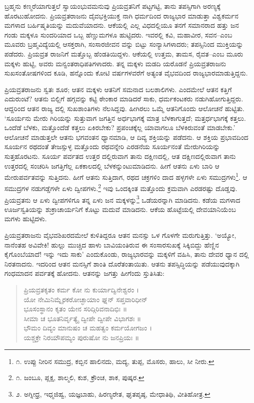 ಬ್ರಹ್ಮನು ಕಣ್ಮರೆಯಾಗುತ್ತಲೆ ಸ್ವಾಯಂಭುವಮನುವು ಪ್ರಿಯವ್ರತನಿಗೆ ಪಟ್ಟಗಟ್ಟಿ, ತಾನು ತಪಸ್ಸಿಗಾಗಿ ಅರಣ್ಯಕ್ಕೆ ಹೊರಟುಹೋದನು. ಪ್ರಿಯವ್ರತರಾಜನು ದೈವಭಕ್ತಿಯುಕ್ತ ನಾಗಿ ಧರ್ಮದಿಂದ ರಾಜ್ಯಭಾರ ಮಾಡುತ್ತಾ ವಿಶ್ವಕರ್ಮನ ಮಗಳಾದ ಬರ್ಹಿಷ್ಮತಿಯನ್ನು ಮದುವೆಯಾದನು. ಆಕೆಯಲ್ಲಿ ಎಲ್ಲ ವಿಧದಲ್ಲಿಯೂ ತನಗೆ ಸಮಾನರಾದ ಹತ್ತು ಜನ ಗಂಡು ಮಕ್ಕಳೂ ಸುಂದರಿಯಾದ ಒಬ್ಬ ಹೆಣ್ಣುಮಗಳೂ ಹುಟ್ಟಿದರು. ಇವರಲ್ಲಿ ಕವಿ, ಮಹಾವೀರ, ಸವನ–ಎಂಬ ಮೂವರು ಬ್ರಹ್ಮವಿದ್ಯೆಯಲ್ಲಿ ಆಸಕ್ತರಾಗಿ, ಸಂಸಾರಜೀವನ ವನ್ನು ಬಿಟ್ಟು ಸಂನ್ಯಾಸಿಗಳಾದರು; ತಪಸ್ಸಿನಿಂದ ಮುಕ್ತಿಯನ್ನು ಪಡೆದರು. ಪ್ರಿಯವ್ರತ ರಾಜನಿಗೆ ಮತ್ತೊಬ್ಬ ಹೆಂಡತಿಯಿದ್ದಳು. ಆಕೆಯಲ್ಲಿ ಉತ್ತಮ, ತಾಮಸ, ರೈವತ–ಎಂಬ ಮೂರು ಮಕ್ಕಳು ಹುಟ್ಟಿ, ಅವರು ಮನ್ವಂತರಾಧಿಪತಿಗಳಾದರು. ತನ್ನ ಮಕ್ಕಳು ಮಡದಿ ಯರೊಡನೆ ಪ್ರಿಯವ್ರತರಾಜನು ಸುಖಸಂತೋಷಗಳಿಂದ ಕೂಡಿ, ಹನ್ನೊಂದು ಕೋಟಿ ವರ್ಷಗಳವರೆಗೆ ಅತ್ಯಂತ ವೈಭವದಿಂದ ರಾಜ್ಯಭಾರಮಾಡುತ್ತಿದ್ದನು.

ಪ್ರಿಯವ್ರತರಾಜನು ಸ್ವತಃ ಶೂರ; ಆತನ ಮಕ್ಕಳು ಆತನಿಗೆ ಸಮನಾದ ಬಲಶಾಲಿಗಳು. ಎಂದಮೇಲೆ ಆತನ ಕತ್ತಿಗೆ ಎದುರುಂಟೆ? ಆತನು ಬಿಲ್ಲಿಗೆ ಹಗ್ಗವನ್ನು ಕಟ್ಟಿ ಠೇಂಕಾರ ಮಾಡಿದರೆ ಸಾಕು, ಧರ್ಮಕಂಟಕರು ನಡುಗಿಹೋಗುತ್ತಿದ್ದರು. ಆದ್ದರಿಂದ ಆತನ ರಾಜ್ಯ ದಲ್ಲಿ ಸುಖಶಾಂತಿಗಳು ನೆಲಸಿದ್ದವು. ಹೀಗಿರಲು ಒಮ್ಮೆ ಆತನಿಗೊಂದು ಆಲೋಚನೆ ಹುಟ್ಟಿತು. ‘ಸೂರ್ಯನು ಮೇರು ಗಿರಿಯನ್ನು ಸುತ್ತುವಾಗ ಜಗತ್ತಿನ ಅರ್ಧಭಾಗಕ್ಕೆ ಮಾತ್ರ ಬೆಳಕಾಗುತ್ತದೆ; ಮತ್ತರ್ಧಭಾಗಕ್ಕೆ ಕತ್ತಲು. ಒಂದೆಡೆ ಬೆಳಕು, ಮತ್ತೊಂದೆಡೆ ಕತ್ತಲು ಏಕಿರಬೇಕು? ಪ್ರಪಂಚಕ್ಕೆಲ್ಲ ಯಾವಾಗಲೂ ಬೆಳಕಿರುವಂತೆ ಮಾಡಬೇಕು.’ ಆಲೋಚನೆ ಮಾಡುತ್ತಲೇ ಆತನು ಭಗವಂತನ ಧ್ಯಾನಮಾಡಿ, ಆ ದಿವ್ಯ ಶಕ್ತಿಯನ್ನು ಪಡೆದನು. ಆ ಶಕ್ತಿಯ ಪ್ರಭಾವದಿಂದ ಸೂರ್ಯನ ರಥದಂತೆ ತೇಜಸ್ಸುಳ್ಳ ಮತ್ತೊಂದು ರಥವನ್ನೇರಿ ಎರಡನೆಯ ಸೂರ್ಯನಂತೆ ಮೇರುಗಿರಿಯನ್ನು ಸುತ್ತಹೊರಟನು. ಸೂರ್ಯ ಪರ್ವತದ ಉತ್ತರ ದಲ್ಲಿರುವಾಗ ತಾನು ದಕ್ಷಿಣದಲ್ಲಿ, ಆತ ದಕ್ಷಿಣದಲ್ಲಿರುವಾಗ ತಾನು ಉತ್ತರದಲ್ಲಿ ಸಂಚರಿಸಿ ಜಗತ್ತಿಗೆಲ್ಲ ಏಕಕಾಲದಲ್ಲಿ ಬೆಳಕನ್ನುಂಟುಮಾಡಿದನು. ಹೀಗೆ ಆತನು ಏಳು ಬಾರಿ ಆ ಮೇರುಪರ್ವತವನ್ನು ಸುತ್ತಿದನು. ಹೀಗೆ ಆತನು ಸುತ್ತಿದಾಗ, ರಥದ ಚಕ್ರಗಳಿಂ ದಾದ ಹಳ್ಳಗಳೇ ಏಳು ಸಮುದ್ರಗಳು\footnote{೧. ಉಪ್ಪು ನೀರಿನ ಸಮುದ್ರ, ಕಬ್ಬಿನ ಹಾಲಿನದು, ಮದ್ಯ, ತುಪ್ಪ, ಮೊಸರು, ಹಾಲು, ಸೀ ನೀರು.}. ಆ ಸಮುದ್ರಗಳ ನಡುಗಡ್ಡೆಗಳೇ ಏಳು ದ್ವೀಪಗಳು.\footnote{೧. ಜಂಬೂ, ಪ್ಲಕ್ಷ, ಶಾಲ್ಮಲಿ, ಕುಶ, ಕ್ರೌಂಚ, ಶಾಕ, ಪುಷ್ಕರ.} ಇವು ಒಂದಕ್ಕಿಂತ ಮತ್ತೊಂದು ಕ್ರಮವಾಗಿ ಎರಡರಷ್ಟು ದೊಡ್ಡವು. ಪ್ರಿಯವ್ರತನು ಆ ಏಳು ದ್ವೀಪಗಳಿಗೂ ತನ್ನ ಏಳು ಜನ ಮಕ್ಕಳನ್ನು\footnote{೨. ಅಗ್ನೀಧ್ರ, ಇಧ್ಮಜಿಹ್ವ, ಯಜ್ಞಬಾಹು, ಹಿರಣ್ಯರೇತ, ಘೃತಪೃಷ್ಠ, ಮೇಧಾತಿಥಿ, ವೀತಿಹೋತ್ರ.} ಒಡೆಯರನ್ನಾಗಿ ಮಾಡಿದನು. ಕಡೆಯ ಮಗಳಾದ ಊರ್ಜಸ್ವತಿಯನ್ನು ಶುಕ್ರಾಚಾರ್ಯನಿಗೆ ಕೊಟ್ಟು ಮದುವೆ ಮಾಡಿದನು. ಆಕೆಯ ಹೊಟ್ಟೆಯಲ್ಲಿ ದೇವಯಾನಿಯೆಂಬ ಮಗಳು ಹುಟ್ಟಿದಳು.

ಪ್ರಿಯವ್ರತರಾಜನು ವೈಭವಶಿಖರದಮೇಲೆ ಕುಳಿತಿದ್ದರೂ ಆತನ ಮನಸ್ಸು ಒಳ ಗೊಳಗೇ ಮರುಗುತ್ತಿತ್ತು. ‘ಅಯ್ಯೋ, ನಾನೆಂತಹ ಅವಿವೇಕಿ! ಹುಲ್ಲು ಮುಚ್ಚಿದ ಹಾಳು ಬಾವಿಯಂತಿರುವ ಈ ಸಂಸಾರಸುಖಕ್ಕೆ ಸಿಕ್ಕಿಬಿದ್ದು ಹೆಣ್ಣಿನ ಕೈಗೊಂಬೆಯಾದೆ! ಇನ್ನು ಇದು ಸಾಕು’ ಎಂದುಕೊಂಡು, ರಾಜ್ಯಭಾರವನ್ನು ಮಕ್ಕಳಿಗೆ ವಹಿಸಿ, ತಾನು ದೇವರ ಧ್ಯಾನ ದಲ್ಲಿ ನಿರತನಾದನು. ಇದರಿಂದ ಆತನ ಮನಸ್ಸಿಗೆ ಶಾಂತಿ ದೊರೆತಂತಾಯಿತು. ಆತನು ತಪಸ್ಸಿದ್ಧಿಯನ್ನು ಪಡೆಯುವುದಕ್ಕಾಗಿ ಗಂಧಮಾದನ ಪರ್ವತಕ್ಕೆ ಹೋದನು. ಆತನನ್ನು ಜಗತ್ತು ಹೀಗೆಂದು ಸ್ತುತಿಸಿತು:

\begin{verse}
ಪ್ರಿಯವ್ರತಕೃತಂ ಕರ್ಮ ಕೋ ನು ಕುರ್ಯಾದ್ವಿನೇಶ್ವರಂ ।\\ಯೋ ನೇಮಿನಿಮ್ನೈರಕರೋಚ್ಛಾಯಾಂ ಘ್ನನ್ ಸಪ್ತವಾರಿಧೀನ್​\\ಭೂಸಂಸ್ಥಾನಂ ಕೃತಂ ಯೇನ ಸರಿದ್ಗಿರಿವನಾದಿಭಿಃ ॥\\ಸೀಮಾ ಚ ಭೂತನಿರ್ವೃತ್ಯೈ ದ್ವೀಪೇ ದ್ವೀಪೇ ವಿಭಾಗಶಃ ॥\\ಭೌಮಂ ದಿವ್ಯಂ ಮಾನುಷಂ ಚ ಮಹತ್ವಂ ಕರ್ಮಯೋಗಜಂ ।\\ಯಶ್ಚಕ್ರೇ ನಿರಯೌಪಮ್ಯಂ ಪುರುಷೋ ನು ಜನಪ್ರಿಯಃ ॥
\end{verse}

